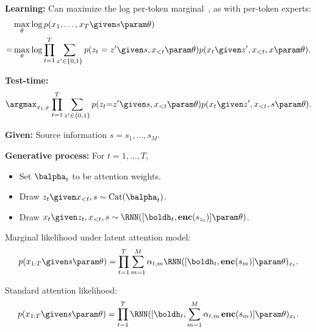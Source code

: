 \begin{frame}
\textbf{Learning:} Can maximize the log per-token marginal~\citep{gu2016incorporating}, as with per-token experts:
        \begin{align*}
        &\max_{\theta} \log p(x_1, \ldots, x_T \given s \param \theta) \\
        = &\max_{\theta} \log \prod_{t=1}^T \sum_{z' \in\{0, 1\}} p(z_t = z' \given s, x_{<t} \param \theta) p(x_t \given z', x_{<t}, x \param \theta).
    \end{align*}
    
    \air
    \air
\textbf{Test-time:}
\begin{align*}
\argmax_{x_{1:T}} \prod_{t=1}^T \sum_{z' \in\{0, 1\}} p(z_t {=} z' \given s, x_{<t} \param \theta) p(x_t \given z', x_{<t}, s \param \theta).
\end{align*}
\end{frame}

\begin{frame}
\textbf{Given:} Source information $s = s_1, \ldots, s_M$.
\air

\textbf{Generative process:} For $t=1, \ldots, T$,
\begin{itemize}
    \item Set $\balpha_t$ to be attention weights.
    \item Draw $z_{t} \given x_{ < t}, s \sim \mathrm{Cat}(\balpha_t)$.
    \item Draw $x_{t} \given z_{t}, x_{< t}, s \sim \RNN([\boldh_t, \benc(s_{z_{t}})] \param \theta)$.
\end{itemize}

\end{frame}

\begin{frame}
Marginal likelihood under latent attention model:
    \begin{align*}
       p(x_{1:T} \given s \param \theta) = \prod_{t=1}^T \sum_{m=1}^M \alpha_{t,m} \RNN([\boldh_t, \benc(s_{m})] \param \theta)_{x_t}.
    \end{align*}
    
\air
\air
\air
\air

Standard attention likelihood:
    \begin{align*}
        p(x_{1:T} \given s \param \theta) = \prod_{t=1}^T  \RNN([\boldh_t, \sum_{m=1}^M \alpha_{t,m} \, \benc(s_{m})] \param \theta)_{x_t}.
    \end{align*}
    
\end{frame}

